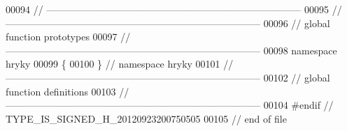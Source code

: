 \begin{DoxyCode}
00094 \textcolor{comment}{//
      ------------------------------------------------------------------------------}
00095 \textcolor{comment}{//
      ------------------------------------------------------------------------------}
00096 \textcolor{comment}{// global function prototypes}
00097 \textcolor{comment}{//
      ------------------------------------------------------------------------------}
00098 \textcolor{keyword}{namespace }hryky
00099 \{
00100 \} \textcolor{comment}{// namespace hryky}
00101 \textcolor{comment}{//
      ------------------------------------------------------------------------------}
00102 \textcolor{comment}{// global function definitions}
00103 \textcolor{comment}{//
      ------------------------------------------------------------------------------}
00104 \textcolor{preprocessor}{#endif // TYPE\_IS\_SIGNED\_H\_20120923200750505}
00105 \textcolor{preprocessor}{}\textcolor{comment}{// end of file}
\end{DoxyCode}
